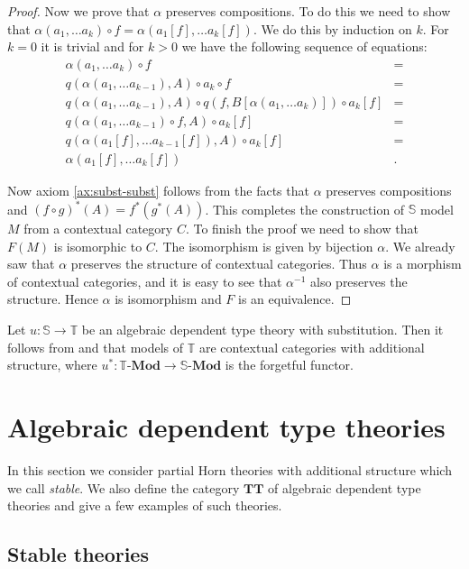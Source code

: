 \documentclass[reqno]{amsart}
\theoremstyle{definition}
\theoremstyle{remark}
\newcommand{\cat}[1]{\mathbf{#1}}
\newcommand{\algtt}{\cat{TT}}
\newcommand{\substTh}{\mathbb{S}}
\newcommand{\Mod}[1]{#1\text{-}\cat{Mod}}
\numberwithin{figure}{section}
\begin{document}
\begin{proof}
Now we prove that $\alpha$ preserves compositions.
To do this we need to show that $\alpha(a_1, \ldots a_k) \circ f = \alpha(a_1[f], \ldots a_k[f])$.
We do this by induction on $k$.
For $k = 0$ it is trivial and for $k > 0$ we have the following sequence of equations:
\begin{align*}
\alpha(a_1, \ldots a_k) \circ f & = \\
q(\alpha(a_1, \ldots a_{k-1}), A) \circ a_k \circ f & = \\
q(\alpha(a_1, \ldots a_{k-1}), A) \circ q(f, B[\alpha(a_1, \ldots a_k)]) \circ a_k[f] & = \\
q(\alpha(a_1, \ldots a_{k-1}) \circ f, A) \circ a_k[f] & = \\
q(\alpha(a_1[f], \ldots a_{k-1}[f]), A) \circ a_k[f] & = \\
\alpha(a_1[f], \ldots a_k[f]) & .
\end{align*}

Now axiom \eqref{ax:subst-subst} follows from the facts that $\alpha$ preserves compositions and $(f \circ g)^*(A) = f^*(g^*(A))$.
This completes the construction of $\substTh$ model $M$ from a contextual category $C$.
To finish the proof we need to show that $F(M)$ is isomorphic to $C$.
The isomorphism is given by bijection $\alpha$.
We already saw that $\alpha$ preserves the structure of contextual categories.
Thus $\alpha$ is a morphism of contextual categories, and it is easy to see that $\alpha^{-1}$ also preserves the structure.
Hence $\alpha$ is isomorphism and $F$ is an equivalence.
\end{proof}

Let $u : \substTh \to \mathbb{T}$ be an algebraic dependent type theory with substitution.
Then it follows from  and  that models of $\mathbb{T}$ are contextual categories with additional structure,
    where $u^* : \Mod{\mathbb{T}} \to \Mod{\substTh}$ is the forgetful functor.

\section{Algebraic dependent type theories}

In this section we consider partial Horn theories with additional structure which we call \emph{stable}.
We also define the category $\algtt$ of algebraic dependent type theories and give a few examples of such theories.

\subsection{Stable theories}
\end{document}
